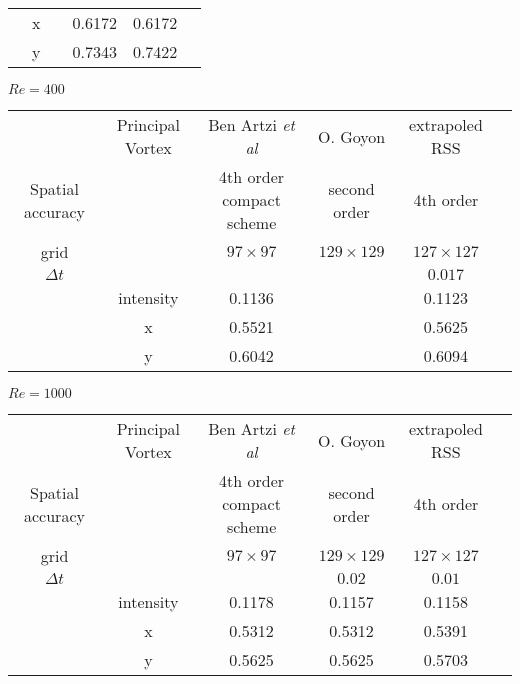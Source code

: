 \documentclass[11pt]{article}
\begin{document}
{\begin{table}[!h]
\begin{center}
\begin{tabular}{| c|c|c|c|c|c | }
  & x &   & 0.6172 & 0.6172 \\ 

  & y &   & 0.7343 & 0.7422 \\ 
\hline 
\end{tabular}


\vspace{0.5cm}


$Re=400$

\begin{tabular}{| c|c|c|c|c|c | }
\hline 
 & Principal Vortex  & Ben Artzi {\it et al} \cite{BenArtziCroisille} & O. Goyon \cite{Goyon} & extrapoled RSS \\ 
Spatial accuracy &                  & 4th order compact scheme                        & second order      &   4th order          \\
\hline 
grid &   & $97 \times 97$ & $ 129 \times 129$ & $127 \times 127$ \\ 
\hline
 $\Delta t$&  & & &$0.017$\\
 \hline
& intensity & 0.1136 &   & 0.1123 \\ 

  & x & 0.5521 &   & 0.5625 \\ 

  & y & 0.6042 &   & 0.6094 \\ 
\hline 
\end{tabular}

\vspace{0.5cm}

$Re=1000$

\begin{tabular}{| c|c|c|c|c|c | }
\hline 
 & Principal Vortex  & Ben Artzi {\it et al} \cite{BenArtziCroisille} & O. Goyon \cite{Goyon} & extrapoled RSS \\ 
Spatial accuracy &                  & 4th order compact scheme                        & second order      &   4th order          \\
\hline 
grid &   & $97 \times 97$ & $ 129 \times 129$ & $127 \times 127$ \\ 
\hline
$\Delta t$ & & &$0.02$ & $0.01$\\ 
\hline
&  intensity  & 0.1178 & 0.1157 & 0.1158 \\ 

  & x & 0.5312 & 0.5312 & 0.5391 \\ 
 
  & y & 0.5625 & 0.5625 & 0.5703 \\ 
\hline 
\end{tabular}


\end{center}
\end{table}}
\end{document}
